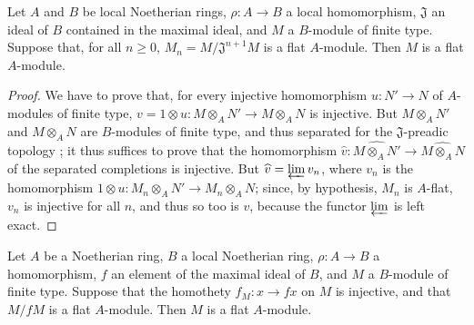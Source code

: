 \begin{proposition}[10.2.6]
\label{0.10.2.6}
Let $A$ and $B$ be local Noetherian rings, $\rho:A\to B$ a local homomorphism, $\mathfrak{J}$ an ideal of $B$ contained in the maximal ideal, and $M$ a $B$-module of finite type.
Suppose that, for all $n\geq0$, $M_n=M/\mathfrak{J}^{n+1}M$ is a flat $A$-module.
Then $M$ is a flat $A$-module.
\end{proposition}

\begin{proof}
We have to prove that, for every injective homomorphism $u:N'\to N$ of $A$-modules of finite type, $v=1\otimes u:M\otimes_A N'\to M\otimes_A N$ is injective.
But $M\otimes_A N'$ and $M\otimes_A N$ are $B$-modules of finite type, and thus separated for the $\mathfrak{J}$-preadic topology ;
it thus suffices to prove that the homomorphism $\widehat{v}:\widehat{M\otimes_A N'}\to\widehat{M\otimes_A N}$ of the separated completions is injective.
But $\widehat{v}=\varprojlim v_n$, where $v_n$ is the homomorphism $1\otimes u:M_n\otimes_A N'\to M_n\otimes_A N$;
since, by hypothesis, $M_n$ is $A$-flat, $v_n$ is injective for all $n$, and thus so too is $v$, because the functor $\varprojlim$ is left exact.
\end{proof}

\begin{corollary}[10.2.7]
\label{0.10.2.7}
Let $A$ be a Noetherian ring, $B$ a local Noetherian ring, $\rho:A\to B$ a homomorphism, $f$ an element of the maximal ideal of $B$, and $M$ a $B$-module of finite type.
Suppose that the homothety $f_M:x\to fx$ on $M$ is injective, and that $M/fM$ is a flat $A$-module.
Then $M$ is a flat $A$-module.
\end{corollary}

